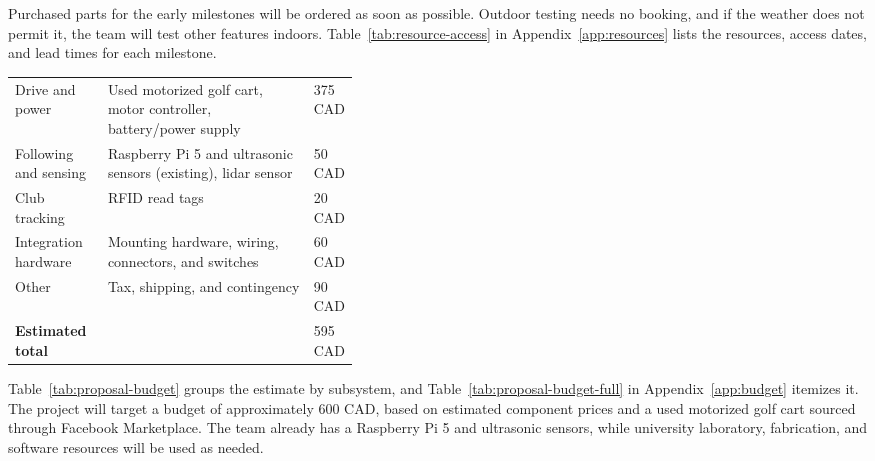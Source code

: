 \label{sec:resources}

Purchased parts for the early milestones will be ordered as soon as possible. Outdoor testing needs no booking, and if the weather does not permit it, the team will test other features indoors. Table~\ref{tab:resource-access} in Appendix~\ref{app:resources} lists the resources, access dates, and lead times for each milestone.



\begin{TableBlock}
\small
{}\label{tab:proposal-budget}
\begin{tabularx}{\linewidth}{@{}L{0.27\linewidth} Y L{0.13\linewidth}@{}}
 &  &  \\
\midrule
Drive and power & Used motorized golf cart, motor controller, battery/power supply & 375 CAD \\
Following and sensing & Raspberry Pi 5 and ultrasonic sensors (existing), lidar sensor & 50 CAD \\
Club tracking & RFID read tags & 20 CAD \\
Integration hardware & Mounting hardware, wiring, connectors, and switches & 60 CAD \\
Other & Tax, shipping, and contingency & 90 CAD \\
\midrule
\textbf{Estimated total} & & 595 CAD \\
\bottomrule
\end{tabularx}
\end{TableBlock}

Table~\ref{tab:proposal-budget} groups the estimate by subsystem, and Table~\ref{tab:proposal-budget-full} in Appendix~\ref{app:budget} itemizes it. The project will target a budget of approximately 600 CAD, based on estimated component prices and a used motorized golf cart sourced through Facebook Marketplace. The team already has a Raspberry Pi 5 and ultrasonic sensors, while university laboratory, fabrication, and software resources will be used as needed.
